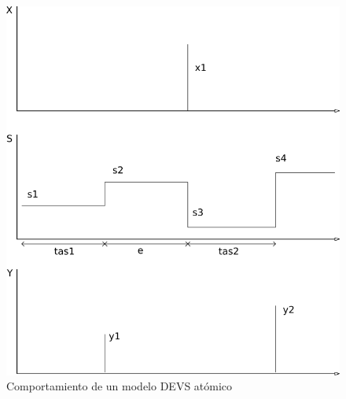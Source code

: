 \documentclass{beamer}
\begin{document}
\begin{frame}
	\begin{figure}[H]
	  \includegraphics[scale=0.5]{devs-atomic}
	  \caption{Comportamiento de un modelo DEVS atómico}
	   \label{fig:fig2-5}
	\end{figure}
\end{frame}
\end{document}
